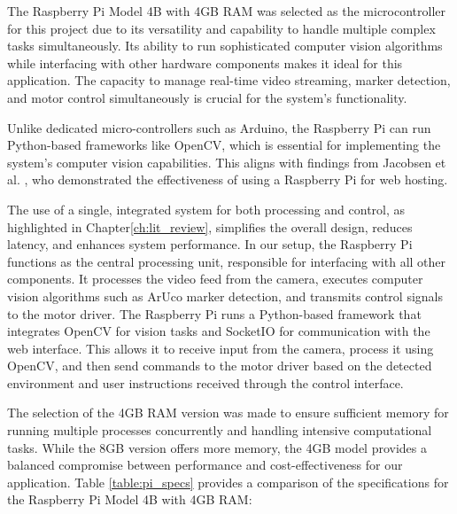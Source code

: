 The Raspberry Pi Model 4B with 4GB RAM was selected as the microcontroller for this project due to its versatility and capability to handle multiple complex tasks simultaneously. Its ability to run sophisticated computer vision algorithms while interfacing with other hardware components makes it ideal for this application. The capacity to manage real-time video streaming, marker detection, and motor control simultaneously is crucial for the system's functionality.

Unlike dedicated micro-controllers such as Arduino, the Raspberry Pi can run Python-based frameworks like OpenCV, which is essential for implementing the system's computer vision capabilities. This aligns with findings from Jacobsen et al. \cite{jacobsen2018}, who demonstrated the effectiveness of using a Raspberry Pi for web hosting.

The use of a single, integrated system for both processing and control, as highlighted in Chapter\ref{ch:lit_review}, simplifies the overall design, reduces latency, and enhances system performance. In our setup, the Raspberry Pi functions as the central processing unit, responsible for interfacing with all other components. It processes the video feed from the camera, executes computer vision algorithms such as ArUco marker detection, and transmits control signals to the motor driver. The Raspberry Pi runs a Python-based framework that integrates OpenCV for vision tasks and SocketIO for communication with the web interface. This allows it to receive input from the camera, process it using OpenCV, and then send commands to the motor driver based on the detected environment and user instructions received through the control interface.

The selection of the 4GB RAM version was made to ensure sufficient memory for running multiple processes concurrently and handling intensive computational tasks. While the 8GB version offers more memory, the 4GB model provides a balanced compromise between performance and cost-effectiveness for our application. Table \ref{table:pi_specs} provides a comparison of the specifications for the Raspberry Pi Model 4B with 4GB RAM:


